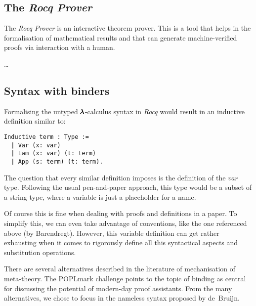 \subsection{The \textit{Rocq Prover}}



The \textit{Rocq Prover} is an interactive theorem prover.
This is a tool that helps in the formalisation of mathematical results and that can generate machine-verified proofs via interaction with a human.

\dots




\subsection{Syntax with binders}

Formalising the untyped $\pmb{\lambda}$-calculus syntax in \textit{Rocq} would result in an inductive definition similar to:

\begin{lstlisting}[language=Coq]
  Inductive term : Type :=
  | Var (x: var)
  | Lam (x: var) (t: term)
  | App (s: term) (t: term).
\end{lstlisting}

The question that every similar definition imposes is the definition of the \lst$var$ type. Following the usual pen-and-paper approach, this type would be a subset of a string type, where a variable is just a placeholder for a name.

Of course this is fine when dealing with proofs and definitions in a paper.
To simplify this, we can even take advantage of conventions, like the one referenced above (by Barendregt).
However, this variable definition can get rather exhausting  when it comes to rigorously define all this syntactical aspects and substitution operations.

There are several alternatives described in the literature of mechanisation of meta-theory. 
The POPLmark challenge \cite{POPLmark} points to the topic of binding as central for discussing the potential of modern-day proof assistants.
From the many alternatives, we chose to focus in the nameless syntax proposed by de~Bruijn.

